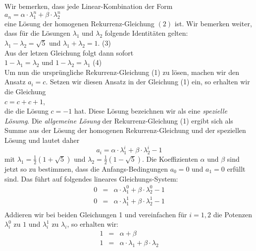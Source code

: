 Wir bemerken, dass jede Linear-Kombination der Form
\\[0.2cm]
\hspace*{1.3cm}
$a_n = \alpha \cdot \lambda_1^n + \beta \cdot \lambda_2^n$
\\[0.2cm]
eine L\"osung der homogenen Rekurrenz-Gleichung $(2)$ ist.
Wir bemerken weiter, dass f\"ur die L\"osungen $\lambda_1$ und $\lambda_2$ folgende Identit\"aten gelten:
\\[0.1cm]
\hspace*{1.3cm} 
$\lambda_1 - \lambda_2 = \sqrt{5}$ \quad und \quad $\lambda_1 + \lambda_2 = 1$. \hspace*{\fill} (3) \\[0.1cm]
Aus der letzen Gleichung folgt dann sofort \\[0.1cm]
\hspace*{1.3cm} $1 - \lambda_1 = \lambda_2$ \quad und \quad $1 - \lambda_2 = \lambda_1$ \hspace*{\fill} (4)  \\[0.1cm]
Um nun die urspr\"ungliche Rekurrenz-Gleichung (1) zu l\"osen, machen wir den Ansatz 
$a_i = c$.  Setzen wir diesen Ansatz in der Gleichung (1) ein, so erhalten wir die Gleichung \\[0.1cm]
\hspace*{1.3cm} $c = c + c + 1$, \\[0.1cm]
die die L\"osung $c = -1$ hat.  Diese L\"osung bezeichnen wir als eine \emph{spezielle L\"osumg}.
Die \emph{allgemeine L\"osung} der Rekurrenz-Gleichung (1) 
ergibt sich als Summe aus der L\"osung der homogenen Rekurrenz-Gleichung und der speziellen
L\"osung und lautet daher 
\[ a_i = \alpha \cdot \lambda_1^i + \beta \cdot \lambda_2^i - 1 \]
mit $\lambda_1 = \frac{1}{2} (1 + \sqrt{5})$ und $\lambda_2 = \frac{1}{2} (1 - \sqrt{5})$.
Die Koeffizienten $\alpha$ und $\beta$ sind jetzt so zu bestimmen, dass die
Anfangs-Bedingungen $a_0 = 0$ und $a_1 = 0$ erf\"ullt sind.  Das f\"uhrt auf folgendes
lineares Gleichungs-System: 
\[\begin{array}{lcl}
    0 & = & \alpha \cdot \lambda_1^0 + \beta \cdot \lambda_2^0 - 1 \\[0.1cm]
    0 & = & \alpha \cdot \lambda_1^1 + \beta \cdot \lambda_2^1 - 1 \\
  \end{array}
\]
Addieren wir bei beiden Gleichungen 1 und vereinfachen f\"ur $i=1,2$ die Potenzen $\lambda_i^0$ zu $1$ und
$\lambda_i^1$ zu $\lambda_i$, so erhalten wir:
\[\begin{array}{lcl}
    1 & = & \alpha + \beta \\[0.1cm]
    1 & = & \alpha \cdot \lambda_1 + \beta \cdot \lambda_2  \\
  \end{array}
\]
